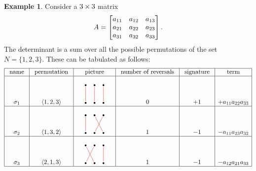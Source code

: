 \documentclass[reqno]{amsart}
\theoremstyle{definition}
\newtheorem{example}[theorem]{Example}
\begin{document}
\begin{example}\label{eg-det-three}
 Consider a $3\times 3$ matrix
 \[ A =
     \left[\begin{matrix}
      a_{11} & a_{12} & a_{13} \\
      a_{21} & a_{22} & a_{23} \\
      a_{31} & a_{32} & a_{33}
     \end{matrix}\right] .
 \]
 The determinant is a sum over all the possible permutations of the
 set $N=\{1,2,3\}$.  These can be tabulated as follows:
 \[
  \begin{array}{|c|c|c|c|c|c|} \hline
   \text{ name } &
   \text{ permutation } &
   \text{ picture } &
   \text{ number of reversals } &
   \text{ signature } &
   \text{ term } \\ \hline
   \sg_1 &
   \ip{1,2,3} &
   \begin{tikzpicture}[scale=0.5]
    \draw[white] (0,0) -- (4,3);
    \fill (1,2) circle(0.1);
    \fill (2,2) circle(0.1);
    \fill (3,2) circle(0.1);
    \fill (1,0) circle(0.1);
    \fill (2,0) circle(0.1);
    \fill (3,0) circle(0.1);
    \draw[red,shorten >=1mm,shorten <=1mm] (1,2) -- (1,0);
    \draw[red,shorten >=1mm,shorten <=1mm] (2,2) -- (2,0);
    \draw[red,shorten >=1mm,shorten <=1mm] (3,2) -- (3,0);
   \end{tikzpicture} &
   0 &
   +1 &
   +a_{11}a_{22}a_{33}
   \\ \hline
   \sg_2 &
   \ip{1,3,2} &
   \begin{tikzpicture}[scale=0.5]
    \draw[white] (0,0) -- (4,3);
    \fill (1,2) circle(0.1);
    \fill (2,2) circle(0.1);
    \fill (3,2) circle(0.1);
    \fill (1,0) circle(0.1);
    \fill (2,0) circle(0.1);
    \fill (3,0) circle(0.1);
    \draw[red,shorten >=1mm,shorten <=1mm] (1,2) -- (1,0);
    \draw[red,shorten >=1mm,shorten <=1mm] (2,2) -- (3,0);
    \draw[red,shorten >=1mm,shorten <=1mm] (3,2) -- (2,0);
   \end{tikzpicture} &
   1 &
   -1 &
   - a_{11}a_{23}a_{32}
   \\ \hline
   \sg_3 &
   \ip{2,1,3} &
   \begin{tikzpicture}[scale=0.5]
    \draw[white] (0,0) -- (4,3);
    \fill (1,2) circle(0.1);
    \fill (2,2) circle(0.1);
    \fill (3,2) circle(0.1);
    \fill (1,0) circle(0.1);
    \fill (2,0) circle(0.1);
    \fill (3,0) circle(0.1);
    \draw[red,shorten >=1mm,shorten <=1mm] (1,2) -- (2,0);
    \draw[red,shorten >=1mm,shorten <=1mm] (2,2) -- (1,0);
    \draw[red,shorten >=1mm,shorten <=1mm] (3,2) -- (3,0);
   \end{tikzpicture} &
   1 &
   -1 &
   - a_{12}a_{21}a_{33}
   \\ \hline

\end{array}\]
\end{example}
\end{document}
